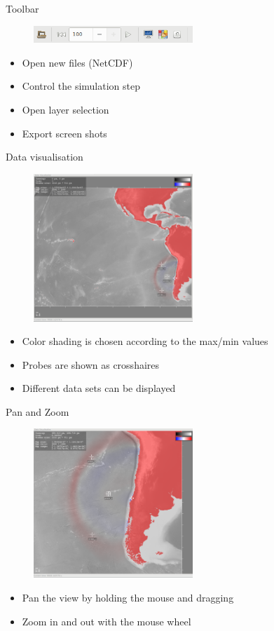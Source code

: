 \documentclass[shortpres,usenames,dvipsnames]{beamer}
\begin{document}
\begin{frame}[fragile]{Toolbar}
	\begin{figure}
		\includegraphics[clip, width=60mm]{img/toolbar.png}
	\end{figure}
	\begin{itemize}
		\item Open new files (NetCDF)
		\item Control the simulation step
		\item Open layer selection
		\item Export screen shots
	\end{itemize}
\end{frame}

\begin{frame}[fragile]{Data visualisation}
	\begin{figure}
		\includegraphics[clip, width=60mm]{img/datavis.png}
	\end{figure}
	\begin{itemize}
		\item Color shading is chosen according to the max/min values
		\item Probes are shown as crosshaires
		\item Different data sets can be displayed
	\end{itemize}
\end{frame}

\begin{frame}[fragile]{Pan and Zoom}
	\begin{figure}
		\includegraphics[clip, width=60mm]{img/zoom.png}
	\end{figure}
	\begin{itemize}
		\item Pan the view by holding the mouse and dragging
		\item Zoom in and out with the mouse wheel
	\end{itemize}
\end{frame}
\end{document}
